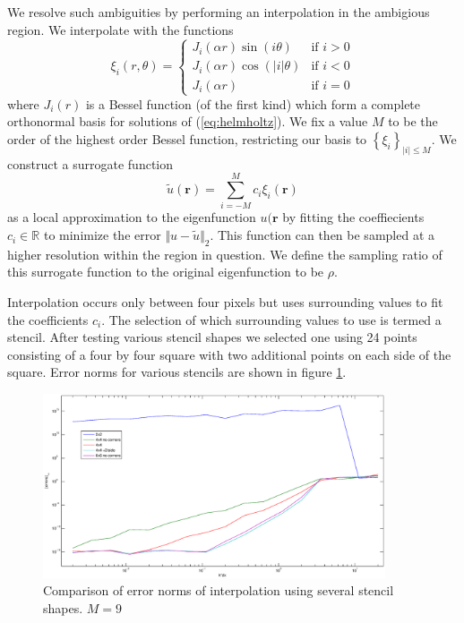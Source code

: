 \documentclass{article}
\newcommand{\rr}[0]{\mathbf{r}}
\begin{document}
We resolve such ambiguities by performing an interpolation in the ambigious region. We interpolate with the functions
\begin{equation}
  \xi_{i}(r, \theta)=\begin{cases}
  J_{i}(\alpha r)\sin(i\theta) & \text{if }i>0\\
  J_{i}(\alpha r)\cos(|i|\theta) & \text{if }i<0\\
  J_{i}(\alpha r) & \text{if }i=0
  \end{cases}
\end{equation}
where $J_i(r)$ is a Bessel function (of the first kind)
which form a complete orthonormal basis for solutions of (\ref{eq:helmholtz}). We fix a value $M$ to be the order of the highest order Bessel function, restricting our basis to $\left\{\xi_{i}\right\}_{\vert i \vert \le M}$. We construct a surrogate function
\[
  \tilde{u}(\rr) = \sum_{i=-M}^{M} c_{i} \xi_{i}(\rr)
\]
as a local approximation to the eigenfunction $u(\rr$ by fitting the coeffiecients $c_{i} \in \mathbb{R}$ to minimize the error $\Vert u - \tilde{u} \Vert_{2}$. This function can then be sampled at a higher resolution within the region in question. We define the sampling ratio of this surrogate function to the original eigenfunction to be $\rho$.

Interpolation occurs only between four pixels but uses surrounding values to fit the coefficients $c_i$. The selection of which surrounding values to use is termed a stencil. After testing various stencil shapes we selected one using 24 points consisting of a four by four square with two additional points on each side of the square. Error norms for various stencils are shown in figure \ref{fig:errors_over_stencils}.

\begin{figure}[h!]
  \begin{center}
    \includegraphics[width=0.9\textwidth]{figs/errors_vs_kdx_over_stencils.eps}
    \caption{Comparison of error norms of interpolation using several stencil shapes. $M=9$}
    \label{fig:errors_over_stencils}
  \end{center}
\end{figure}
\end{document}
